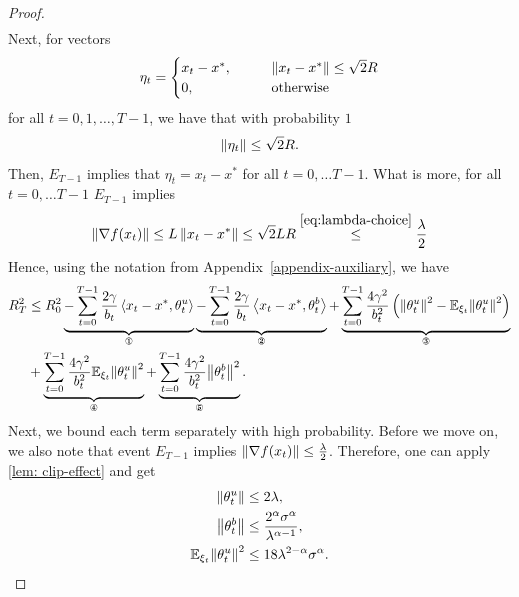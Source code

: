 \documentclass{article}
\begin{document}
\begin{proof}
\begin{align}
    \end{align}
    Next, for vectors
    \begin{align*}
        \eta_t = \begin{cases}
            x_t - x^*, \qquad &\left\lVert x_t - x^*\right\rVert \leq \sqrt{2}R\\
            0, \qquad &\text{otherwise}
        \end{cases}
    \end{align*}
    for all $t = 0, 1, \ldots, T-1$, we have that with probability $1$
    \begin{align}
        \left\lVert\eta_t\right\rVert \leq \sqrt{2}R. \label{eq:bound_eta}
    \end{align}
    Then, $E_{T-1}$ implies that $\eta_t = x_t - x^*$ for all $t = 0, \ldots T-1$. What is more, for all $t = 0, \ldots T-1$ $E_{T-1}$ implies
    \begin{align*}
        \left\lVert\nabla f(x_t)\right\rVert \leq L \left\lVert x_t - x^*\right\rVert \leq \sqrt{2}LR \overset{\eqref{eq:lambda-choice}}{\leq} \frac{\lambda}{2}
    \end{align*}
    Hence, using the notation from Appendix~\ref{appendix-auxiliary}, we have 
    \begin{align}
        \label{eq:convex-require}
        R_T^2 &\leq R_0^2 \underbrace{- \sum\limits_{t=0}^{T-1} \frac{2\gamma}{b_t}\ev{x_t - x^*, \theta_t^u}}_{\circledOne} \underbrace{- \sum\limits_{t=0}^{T-1} \frac{2\gamma}{b_t}\ev{x_t - x^*, \theta_t^b}}_{\circledTwo} +  \underbrace{\sum\limits_{t=0}^{T-1} \frac{4\gamma^2}{b_t^2}\left(\sqn{\theta_t^u} - \E_{\xi_t}\sqn{\theta_t^u}\right)}_{\circledThree} \notag\\
        &+ \underbrace{\sum\limits_{t=0}^{T-1} \frac{4\gamma^2}{b_t^2}\E_{\xi_t}\sqn{\theta_t^u}}_{\circledFour} + \underbrace{\sum\limits_{t=0}^{T-1} \frac{4\gamma^2}{b_t^2}\sqn{\theta_t^b}}_{\circledFive}.
    \end{align}
    Next, we bound each term separately with high probability. Before we move on, we also note that event $E_{T-1}$ implies $\left\lVert\nabla f(x_t)\right\rVert \leq \frac{\lambda}{2}$. Therefore, one can apply \cref{lem: clip-effect} and get
    \begin{align}
        \left\lVert\theta_t^u\right\rVert &\leq 2\lambda, \label{eq:ndjkjdbvjfdbvjdf}\\
        \left\lVert\theta_t^b\right\rVert &\leq \frac{2^\alpha \sigma^\alpha}{\lambda^{\alpha - 1}}, \label{eq:ndjkvjfbdvjfhbvdbfvdf}\\
        {\mathbb E}_{\xi_t}{\left\lVert\theta_t^u\right\rVert}^2 &\leq 18\lambda^{2 - \alpha}\sigma^\alpha. \label{eq:djbjdbvjdbhvjbdfhjvbdhfbdf}
    \end{align}
    

\end{proof}
\end{document}
